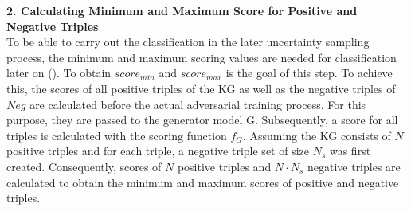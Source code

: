 \textbf{2. Calculating Minimum and Maximum Score for Positive and Negative Triples}\\
To be able to carry out the classification in the later uncertainty sampling process, the minimum and maximum scoring values are needed for classification later on ().
To obtain $score_{min}$ and $score_{max}$ is the goal of this step.
To achieve this, the scores of all positive triples of the \ac{KG} as well as the negative triples of $Neg$ are calculated before the actual adversarial training process.
For this purpose, they are passed to the generator model G.
Subsequently, a score for all triples is calculated with the scoring function $f_G$.
Assuming the \ac{KG} consists of $N$ positive triples and for each triple, a negative triple set of size $N_s$ was first created. 
Consequently, scores of $N$ positive triples and $N \cdot N_s$ negative triples are calculated to obtain the minimum and maximum scores of positive and negative triples.

